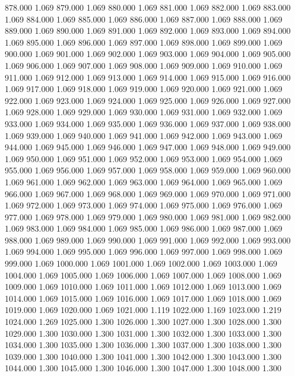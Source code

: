 878.000 1.069 
879.000 1.069 
880.000 1.069 
881.000 1.069 
882.000 1.069 
883.000 1.069 
884.000 1.069 
885.000 1.069 
886.000 1.069 
887.000 1.069 
888.000 1.069 
889.000 1.069 
890.000 1.069 
891.000 1.069 
892.000 1.069 
893.000 1.069 
894.000 1.069 
895.000 1.069 
896.000 1.069 
897.000 1.069 
898.000 1.069 
899.000 1.069 
900.000 1.069 
901.000 1.069 
902.000 1.069 
903.000 1.069 
904.000 1.069 
905.000 1.069 
906.000 1.069 
907.000 1.069 
908.000 1.069 
909.000 1.069 
910.000 1.069 
911.000 1.069 
912.000 1.069 
913.000 1.069 
914.000 1.069 
915.000 1.069 
916.000 1.069 
917.000 1.069 
918.000 1.069 
919.000 1.069 
920.000 1.069 
921.000 1.069 
922.000 1.069 
923.000 1.069 
924.000 1.069 
925.000 1.069 
926.000 1.069 
927.000 1.069 
928.000 1.069 
929.000 1.069 
930.000 1.069 
931.000 1.069 
932.000 1.069 
933.000 1.069 
934.000 1.069 
935.000 1.069 
936.000 1.069 
937.000 1.069 
938.000 1.069 
939.000 1.069 
940.000 1.069 
941.000 1.069 
942.000 1.069 
943.000 1.069 
944.000 1.069 
945.000 1.069 
946.000 1.069 
947.000 1.069 
948.000 1.069 
949.000 1.069 
950.000 1.069 
951.000 1.069 
952.000 1.069 
953.000 1.069 
954.000 1.069 
955.000 1.069 
956.000 1.069 
957.000 1.069 
958.000 1.069 
959.000 1.069 
960.000 1.069 
961.000 1.069 
962.000 1.069 
963.000 1.069 
964.000 1.069 
965.000 1.069 
966.000 1.069 
967.000 1.069 
968.000 1.069 
969.000 1.069 
970.000 1.069 
971.000 1.069 
972.000 1.069 
973.000 1.069 
974.000 1.069 
975.000 1.069 
976.000 1.069 
977.000 1.069 
978.000 1.069 
979.000 1.069 
980.000 1.069 
981.000 1.069 
982.000 1.069 
983.000 1.069 
984.000 1.069 
985.000 1.069 
986.000 1.069 
987.000 1.069 
988.000 1.069 
989.000 1.069 
990.000 1.069 
991.000 1.069 
992.000 1.069 
993.000 1.069 
994.000 1.069 
995.000 1.069 
996.000 1.069 
997.000 1.069 
998.000 1.069 
999.000 1.069 
1000.000 1.069 
1001.000 1.069 
1002.000 1.069 
1003.000 1.069 
1004.000 1.069 
1005.000 1.069 
1006.000 1.069 
1007.000 1.069 
1008.000 1.069 
1009.000 1.069 
1010.000 1.069 
1011.000 1.069 
1012.000 1.069 
1013.000 1.069 
1014.000 1.069 
1015.000 1.069 
1016.000 1.069 
1017.000 1.069 
1018.000 1.069 
1019.000 1.069 
1020.000 1.069 
1021.000 1.119 
1022.000 1.169 
1023.000 1.219 
1024.000 1.269 
1025.000 1.300 
1026.000 1.300 
1027.000 1.300 
1028.000 1.300 
1029.000 1.300 
1030.000 1.300 
1031.000 1.300 
1032.000 1.300 
1033.000 1.300 
1034.000 1.300 
1035.000 1.300 
1036.000 1.300 
1037.000 1.300 
1038.000 1.300 
1039.000 1.300 
1040.000 1.300 
1041.000 1.300 
1042.000 1.300 
1043.000 1.300 
1044.000 1.300 
1045.000 1.300 
1046.000 1.300 
1047.000 1.300 
1048.000 1.300 
